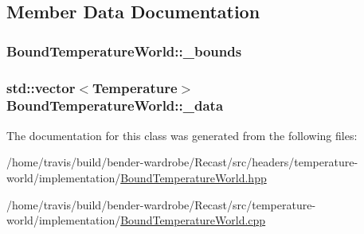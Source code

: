 \subsection{Member Data Documentation}
\hypertarget{class_bound_temperature_world_a4e460fde774b68cb821e6b263e71448b}{
\subsubsection[{\-\_\-bounds}]{ Bound\-Temperature\-World\-::\-\_\-bounds\hspace{0.3cm}{\ttfamily [protected]}}}\label{class_bound_temperature_world_a4e460fde774b68cb821e6b263e71448b}
\hypertarget{class_bound_temperature_world_a7c0722e68bbe02de068ccb6244522c7a}{
\subsubsection[{\-\_\-data}]{\setlength{\rightskip}{0pt plus 5cm}std\-::vector$<${\bf Temperature}$>$ Bound\-Temperature\-World\-::\-\_\-data\hspace{0.3cm}{\ttfamily [protected]}}}\label{class_bound_temperature_world_a7c0722e68bbe02de068ccb6244522c7a}


The documentation for this class was generated from the following files\-:\begin{DoxyCompactItemize}
\item 
/home/travis/build/bender-\/wardrobe/\-Recast/src/headers/temperature-\/world/implementation/\hyperlink{_bound_temperature_world_8hpp}{Bound\-Temperature\-World.\-hpp}\item 
/home/travis/build/bender-\/wardrobe/\-Recast/src/temperature-\/world/implementation/\hyperlink{_bound_temperature_world_8cpp}{Bound\-Temperature\-World.\-cpp}\end{DoxyCompactItemize}
